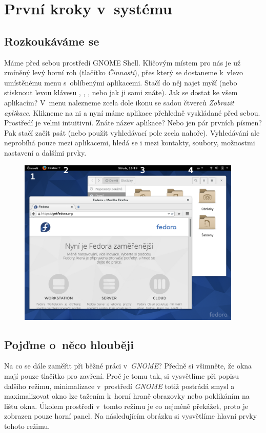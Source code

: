 \chapter*{První kroky v~systému}

\section*{Rozkoukáváme se}
Máme před sebou prostředí GNOME Shell. Klíčovým místem pro nás je už zmíněný levý horní roh (tlačítko \emph{Činnosti}), přes který se dostaneme k~vlevo umístěnému menu s~oblíbenými aplikacemi. Stačí do něj najet myší (nebo stisknout levou klávesu , , , nebo jak ji sami znáte). Jak se dostat ke všem aplikacím? V~menu nalezneme zcela dole ikonu se sadou čtverců \emph{Zobrazit aplikace}. Klikneme na ni a nyní máme aplikace přehledně vyskládané před sebou. Prostředí je velmi intuitivní. Znáte název aplikace? Nebo jen pár prvních písmen? Pak stačí začít psát (nebo použít vyhledávací pole zcela nahoře). Vyhledávání ale neprobíhá pouze mezi aplikacemi, hledá se i mezi kontakty, soubory, možnostmi nastavení a dalšími prvky.

\begin{figure}[t]
\begin{center}
\includegraphics[width=0.95\textwidth]{img/shell-a}
 \label{fig:shell-a}
\end{center}
\end{figure}

\section*{Pojďme o~něco hlouběji}
Na co se dále zaměřit při běžné práci v~\emph{GNOME}? Předně si všimněte, že okna mají pouze tlačítko pro zavření. Proč je tomu tak, si vysvětlíme při popisu dalšího režimu, minimalizace v~prostředí \emph{GNOME} totiž postrádá smysl a maximalizovat okno lze tažením k~horní hraně obrazovky nebo poklikáním na lištu okna. Úkolem prostředí v~tomto režimu je co nejméně překážet, proto je zobrazen pouze horní panel. Na následujícím obrázku si vysvětlíme hlavní prvky tohoto režimu.

